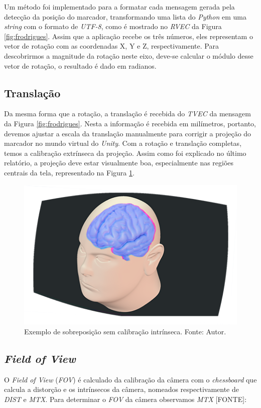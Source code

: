 Um método foi implementado para a formatar cada mensagem gerada pela detecção da posição do marcador, transformando uma lista do \textit{Python} em uma \textit{string} com o formato de \textit{UTF-8}, como é mostrado no \textit{RVEC} da Figura \ref{fig:frodrigues}. Assim que a aplicação recebe os três números, eles representam o vetor de rotação com as coordenadas X, Y e Z, respectivamente. Para descobrirmos a magnitude da rotação neste eixo, deve-se calcular o módulo desse vetor de rotação, o resultado é dado em radianos.

\subsection{Translação}

Da mesma forma que a rotação, a translação é recebida do \textit{TVEC} da mensagem da Figura \ref{fig:frodrigues}. Nesta a informação é recebida em milímetros, portanto, devemos ajustar a escala da translação manualmente para corrigir a projeção do marcador no mundo virtual do \textit{Unity}. Com a rotação e translação completas, temos a calibração extrínseca da projeção. Assim como foi explicado no último relatório, a projeção deve estar visualmente boa, especialmente nas regiões centrais da tela, representado na Figura \ref{fig:Extrinsecos}.

\begin{figure}[ht]
    \centering
    \includegraphics[width=.45\linewidth]{figuras/CalibExtr.png}
    \caption{Exemplo de sobreposição sem calibração intrínseca. Fonte: Autor.}
    \label{fig:Extrinsecos}
\end{figure}

\subsection{\textit{Field of View}}

O \textit{Field of View} (\textit{FOV}) é calculado da calibração da câmera com o \textit{chessboard} que calcula a distorção e os intrínsecos da câmera, nomeados respectivamente de \textit{DIST} e \textit{MTX}. Para determinar o \textit{FOV} da câmera observamos \textit{MTX} [FONTE]:

